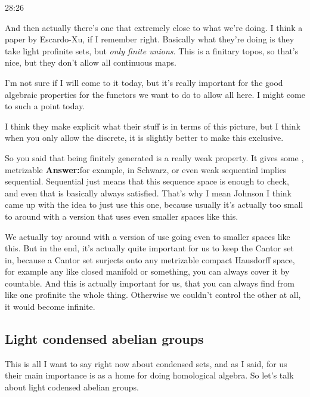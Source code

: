 \begin{example}
\begin{unfinished}{28:26}
\begin{remark}
\begin{remark}
And then actually there's one that extremely close to what we're doing. I think a paper by Escardo-Xu, if I remember right. Basically what they're doing is they take light profinite sets, but \emph{only finite unions}. This is a finitary topos, so that's nice, but they don't allow all continuous maps.

I'm not sure if I will come to it today, but it's really important for the good algebraic properties for the functors we want to do to allow all here. I might come to such a point today.

I think they make explicit what their stuff is in terms of this picture, but I think when you only allow the discrete, it is slightly better to make this exclusive.

So you said that being finitely generated is a really weak property. It gives some , 
metrizable
\textbf{Answer:}for example, in Schwarz, or even weak sequential implies sequential. Sequential just means that this sequence space is enough to check, and even that is basically always satisfied. That's why I mean Johnson I think came up with the idea to just use this one, because usually it's actually too small to around with a version that uses even smaller spaces like this.

We actually toy around with a version of use going even to smaller spaces like this. But in the end, it's actually quite important for us to keep the Cantor set in, because a Cantor set surjects onto any metrizable compact Hausdorff space, for example any like closed manifold or something, you can always cover it by countable. And this is actually important for us, that you can always find from like one profinite the whole thing. Otherwise we couldn't control the other at all, it would become infinite.

\subsection{Light condensed abelian groups} \label{subsec:light_condensed_abelian_groups}

This is all I want to say right now about condensed sets, and as I said, for us their main importance is as a home for doing homological algebra. So let's talk about light codensed abelian groups.


\end{remark}
\end{remark}
\end{unfinished}
\end{example}
